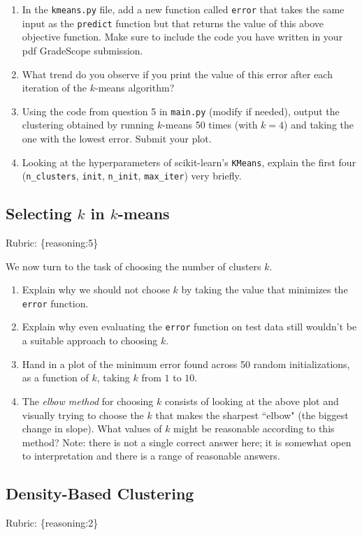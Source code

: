 \documentclass{article}
\def\rubric#1{\gre{Rubric: \{#1\}}}{}
\def\blu#1{{\color{blu}#1}}
\def\gre#1{{\color{gre}#1}}
\def\enum#1{\begin{enumerate}#1\end{enumerate}}
\begin{document}
 \blu{\enum{
 \item In the \texttt{kmeans.py} file, add a new function called \texttt{error} that takes the same input as the \texttt{predict} function but that returns the value of this above objective function.  Make sure to include the code you have written in your pdf GradeScope submission.
 \item What trend do you observe if you print the value of this error after each iteration of the $k$-means algorithm?
 \item Using the code from question 5 in \texttt{main.py} (modify if needed), output the clustering obtained by running $k$-means 50 times (with $k=4$) and taking the one with the lowest error. Submit your plot.
 \item Looking at the hyperparameters of scikit-learn's \texttt{KMeans}, explain the first four (\texttt{n\_clusters}, \texttt{init}, \texttt{n\_init}, \texttt{max\_iter}) very briefly.
 }}


 \subsection{Selecting $k$ in $k$-means}
\rubric{reasoning:5}

 We now turn to the task of choosing the number of clusters $k$.

 \blu{\enum{
 \item Explain why we should not choose $k$ by taking the value that minimizes the \texttt{error} function.
 \item Explain why even evaluating the \texttt{error} function on test data still wouldn't be a suitable approach to choosing $k$.
 \item Hand in a plot of the minimum error found across 50 random initializations, as a function of $k$, taking $k$ from $1$ to $10$.
 \item The \emph{elbow method} for choosing $k$ consists of looking at the above plot and visually trying to choose the $k$ that makes the sharpest ``elbow" (the biggest change in slope). What values of $k$ might be reasonable according to this method? Note: there is not a single correct answer here; it is somewhat open to interpretation and there is a range of reasonable answers.
 }}

\subsection{Density-Based Clustering}
\rubric{reasoning:2}
\end{document}
